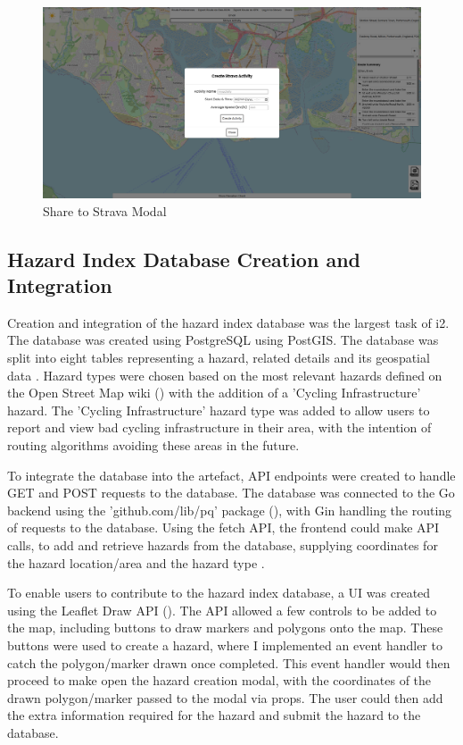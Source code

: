 \begin{figure}[!ht]
  \centering
  \includegraphics[width=425px]{figures/Progress Images/Iteration-2/SR18/SR18 Strava Modal.png}
  \caption{Share to Strava Modal}
  \label{fig:strava-modal}
\end{figure}


\subsection{Hazard Index Database Creation and Integration}
\label{iteration2:hazard-index}

Creation and integration of the hazard index database was the largest task of i2. The database was created using PostgreSQL using PostGIS. The database was split into eight tables representing a hazard, related details and its geospatial data . Hazard types were chosen based on the most relevant hazards defined on the Open Street Map wiki (\cite{noauthor_keyhazard_nodate}) with the addition of a 'Cycling Infrastructure' hazard. The 'Cycling Infrastructure' hazard type was added to allow users to report and view bad cycling infrastructure in their area, with the intention of routing algorithms avoiding these areas in the future.

To integrate the database into the artefact, API endpoints were created to handle GET and POST requests to the database. The database was connected to the Go backend using the 'github.com/lib/pq' package (\cite{noauthor_pq_nodate}), with Gin handling the routing of requests to the database. Using the fetch API, the frontend could make API calls, to add and retrieve hazards from the database, supplying coordinates for the hazard location/area and the hazard type .

To enable users to contribute to the hazard index database, a UI was created using the Leaflet Draw API (\cite{noauthor_leaflet_nodate-2}). The API allowed a few controls to be added to the map, including buttons to draw markers and polygons onto the map. These buttons were used to create a hazard, where I implemented an event handler to catch the polygon/marker drawn once completed. This event handler would then proceed to make open the hazard creation modal, with the coordinates of the drawn polygon/marker passed to the modal via props. The user could then add the extra information required for the hazard and submit the hazard to the database.

